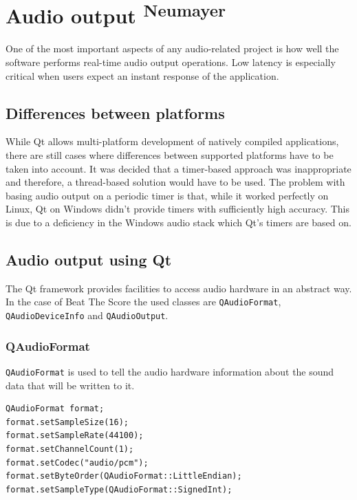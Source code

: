 \chapter{Audio output \textsuperscript{Neumayer}}
\label{chap:Audio output}

One of the most important aspects of any audio-related project is how well the software 
performs real-time audio output operations. Low latency is especially critical 
when users expect an instant response of the application. 

\section{Differences between platforms}

While Qt allows multi-platform development of natively compiled applications, 
there are still cases where differences between supported platforms have to be 
taken into account. It was decided that a timer-based approach was inappropriate 
and therefore, a thread-based solution would have to be used. The problem with basing audio output on a periodic timer is that, while it worked perfectly on Linux, Qt on Windows 
didn't provide timers with sufficiently high accuracy. This is due to a deficiency in the Windows audio stack which Qt's timers are based on.

\section{Audio output using Qt}

The Qt framework provides facilities to access audio hardware in an abstract way. 
In the case of Beat The Score the used classes are {\tt QAudioFormat}, {\tt QAudioDeviceInfo} and {\tt QAudioOutput}.

\subsection{QAudioFormat}

{\tt QAudioFormat} is used to tell the audio hardware information about the sound data that will be 
written to it.
\\

\begin{lstlisting}
QAudioFormat format;
format.setSampleSize(16);
format.setSampleRate(44100);
format.setChannelCount(1);
format.setCodec("audio/pcm");
format.setByteOrder(QAudioFormat::LittleEndian);
format.setSampleType(QAudioFormat::SignedInt);
\end{lstlisting}

